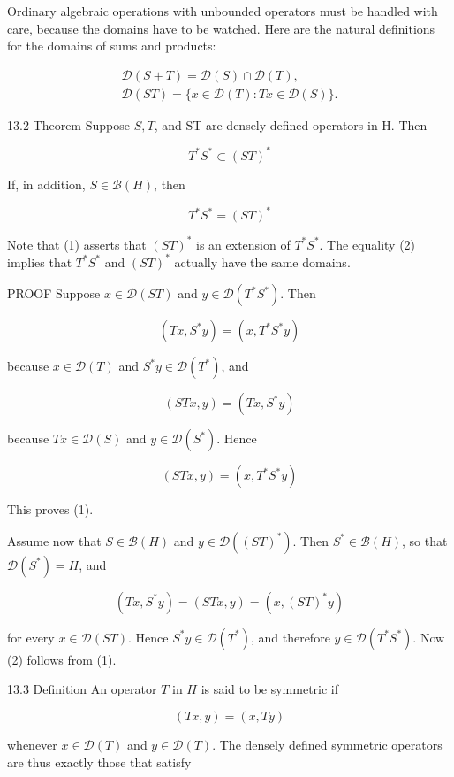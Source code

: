 \documentclass[10pt]{article}
\begin{document}
Ordinary algebraic operations with unbounded operators must be handled with care, because the domains have to be watched. Here are the natural definitions for the domains of sums and products:

$$
\begin{gathered}
\mathscr{D}(S+T)=\mathscr{D}(S) \cap \mathscr{D}(T), \\
\mathscr{D}(S T)=\{x \in \mathscr{D}(T): T x \in \mathscr{D}(S)\} .
\end{gathered}
$$

13.2 Theorem Suppose $S, T$, and ST are densely defined operators in H. Then

$$
T^{*} S^{*} \subset(S T)^{*}
$$

If, in addition, $S \in \mathscr{B}(H)$, then

$$
T^{*} S^{*}=(S T)^{*}
$$

Note that (1) asserts that $(S T)^{*}$ is an extension of $T^{*} S^{*}$. The equality (2) implies that $T^{*} S^{*}$ and $(S T)^{*}$ actually have the same domains.

PROOF Suppose $x \in \mathscr{D}(S T)$ and $y \in \mathscr{D}\left(T^{*} S^{*}\right)$. Then

$$
\left(T x, S^{*} y\right)=\left(x, T^{*} S^{*} y\right)
$$

because $x \in \mathscr{D}(T)$ and $S^{*} y \in \mathscr{D}\left(T^{*}\right)$, and

$$
(S T x, y)=\left(T x, S^{*} y\right)
$$

because $T x \in \mathscr{D}(S)$ and $y \in \mathscr{D}\left(S^{*}\right)$. Hence

$$
(S T x, y)=\left(x, T^{*} S^{*} y\right)
$$

This proves (1).

Assume now that $S \in \mathscr{B}(H)$ and $y \in \mathscr{D}\left((S T)^{*}\right)$. Then $S^{*} \in \mathscr{B}(H)$, so that $\mathscr{D}\left(S^{*}\right)=H$, and

$$
\left(T x, S^{*} y\right)=(S T x, y)=\left(x,(S T)^{*} y\right)
$$

for every $x \in \mathscr{D}(S T)$. Hence $S^{*} y \in \mathscr{D}\left(T^{*}\right)$, and therefore $y \in \mathscr{D}\left(T^{*} S^{*}\right)$. Now (2) follows from (1).

13.3 Definition An operator $T$ in $H$ is said to be symmetric if

$$
(T x, y)=(x, T y)
$$

whenever $x \in \mathscr{D}(T)$ and $y \in \mathscr{D}(T)$. The densely defined symmetric operators are thus exactly those that satisfy
\end{document}
